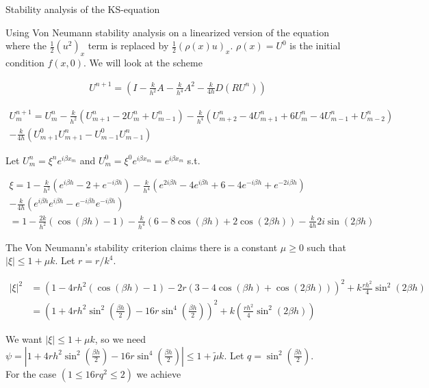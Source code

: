 
Stability analysis of the KS-equation

Using Von Neumann stability analysis on a linearized version of the equation where the $\frac{1}{2}(u^2)_x$ term is replaced by $\frac{1}{2}(\rho(x)u)_x$. $\rho(x) = U^0$ is the initial condition $f(x,0)$. We will look at the scheme 

\large
\begin{align*}
U^{n+1} = (I - \frac{k}{h^2}A - \frac{k}{h^4}A^2 - \frac{k}{4h} D(RU^{n})) 
\end{align*}

\begin{align*}
U^{n+1}_m = U^n_m - \frac{k}{h^2}(U_{m+1}^n-2U_{m}^n+U_{m-1}^n)
- \frac{k}{h^4}(U_{m+2}^n-4U_{m+1}^n+6U_m^n-4U_{m-1}^n+U_{m-2}^n) \\
- \frac{k}{4h}(U_{m+1}^0 U_{m+1}^n-U_{m-1}^0 U_{m-1}^n) 
\end{align*}

Let $U_m^n = \xi^n e^{i \beta x_m}$ and $U_{m}^0 = \xi^0 e^{i\beta x_m} = e^{i\beta x_m}$ s.t.

\begin{align*}
\xi = 1 - \frac{k}{h^2}(e^{i\beta h}-2+e^{-i\beta h}) - \frac{k}{h^4}(e^{2i\beta h}-4e^{i\beta h}+6-4e^{-i\beta h}+e^{-2i\beta h}) \\
 - \frac{k}{4h}(e^{i\beta h}e^{i\beta h} - e^{-i\beta h}e^{-i\beta h})\\
 = 1-\frac{2k}{h^2}(\cos(\beta h)-1) - \frac{k}{h^4}(6-8\cos(\beta h)+2\cos(2\beta h)) - \frac{k}{4h}2i\sin(2\beta h)
\end{align*}

The Von Neumann's stability criterion claims there is a constant $\mu \ge 0$ such that $|\xi| \le 1+ \mu k$. Let $r = r/k^4$.

\begin{align*}
|\xi |^2 &= (1-4rh^2(\cos(\beta h)-1)-2r(3-4\cos(\beta h)+\cos(2\beta h)))^2 + k\frac{rh^2}{4}\sin^2(2\beta h) \\
&= \left(1+4rh^2\sin^2\left(\frac{\beta h}{2}\right)-16r\sin^4\left(\frac{\beta h}{2}\right)\right)^2 + k\left(\frac{rh^2}{4}\sin^2(2\beta h)\right)
\end{align*}

We want $|\xi| \le 1+ \mu k$, so we need $\psi = |1+4rh^2\sin^2\left(\frac{\beta h}{2}\right)-16r\sin^4\left(\frac{\beta h}{2}\right)| \le 1 + \tilde{\mu}k$. Let $q = \sin^2\left(\frac{\beta h}{2}\right)$. \\For the case $(1 \le 16rq^2 \le 2)$ we achieve

